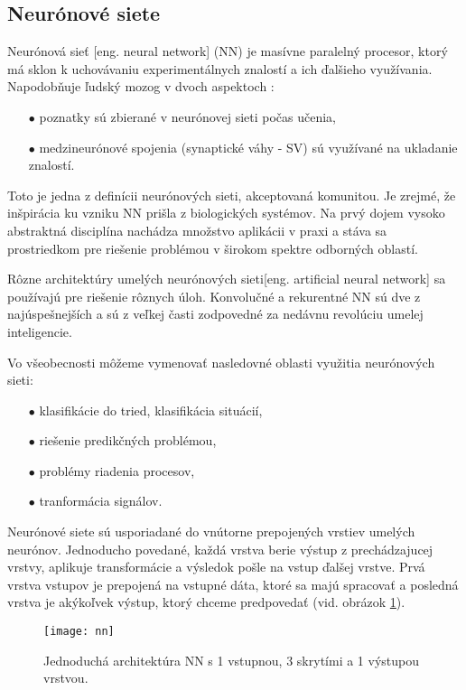 \subsection{Neurónové siete}
Neurónová sieť [eng. neural network] (NN) je masívne paralelný procesor, ktorý má sklon k uchovávaniu experimentálnych znalostí a ich ďalšieho využívania.
Napodobňuje ľudský mozog v dvoch aspektoch \cite{odkaz:NNIntroduction}:
\begin{enumerate}
	\item[$\bullet$] poznatky sú zbierané v neurónovej sieti počas učenia,
	\item[$\bullet$] medzineurónové spojenia (synaptické váhy - SV) sú využívané na ukladanie znalostí.
\end{enumerate}
Toto je jedna z definícii neurónových sieti, akceptovaná komunitou.
Je zrejmé, že inšpirácia ku vzniku NN prišla z biologických systémov.
Na prvý dojem vysoko abstraktná disciplína nachádza množstvo aplikácii v praxi a stáva sa prostriedkom pre riešenie problémou v širokom spektre odborných oblastí\cite{odkaz:NNIntroduction}.

Rôzne architektúry umelých neurónových sieti[eng. artificial neural network] sa používajú pre riešenie rôznych úloh.
Konvolučné a rekurentné NN sú dve z najúspešnejších a sú z veľkej časti zodpovedné za nedávnu revolúciu umelej inteligencie\cite{odkaz:CorrectionOfImageOrentation}.

Vo všeobecnosti môžeme vymenovať nasledovné oblasti využitia neurónových sieti\cite{odkaz:NNIntroduction}:
\begin{enumerate}
    \item[$\bullet$] klasifikácie do tried, klasifikácia situácií,
    \item[$\bullet$] riešenie predikčných problémou,
    \item[$\bullet$] problémy riadenia procesov,
    \item[$\bullet$] tranformácia signálov.
\end{enumerate}

Neurónové siete sú usporiadané do vnútorne prepojených vrstiev umelých neurónov.
Jednoducho povedané, každá vrstva berie výstup z prechádzajucej vrstvy, aplikuje transformácie a výsledok pošle na vstup ďalšej vrstve.
Prvá vrstva vstupov je prepojená na vstupné dáta, ktoré sa majú spracovať a posledná vrstva je akýkoľvek výstup, ktorý chceme predpovedať \cite{odkaz:CorrectionOfImageOrentation} (vid. obrázok \ref{pic:NNExample}).
\begin{figure}[H]
	\centering
	\texttt{[image: nn]}
	\caption{Jednoduchá architektúra NN s 1 vstupnou, 3 skrytími a 1 výstupou vrstvou\cite{odkaz:CorrectionOfImageOrentation}.}
	\label{pic:NNExample}
\end{figure}

